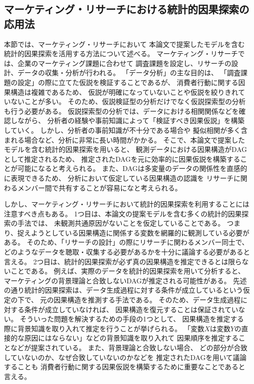 
\subsection{マーケティング・リサーチにおける統計的因果探索の応用法}

本節では、マーケティング・リサーチにおいて
本論文で提案したモデルを含む統計的因果探索を活用する方法について述べる。
マーケティング・リサーチでは、企業のマーケティング課題に合わせて
調査課題を設定し、リサーチの設計、データの収集・分析が行われる。
「データ分析」の主な目的は、
「調査課題の設定」の際に立てた仮説を検証することであるが、
消費者行動に関する因果構造は複雑であるため、
仮説が明確になっていないことや仮説を絞りきれていないことが多い。
そのため、仮説検証型の分析だけでなく仮説探索型の分析も行う必要がある。
仮説探索型の分析では、データにおける相関関係などを確認しながら、
分析者の経験や事前知識によって「検証すべき因果仮説」を構築していく。
しかし、分析者の事前知識が不十分である場合や
擬似相関が多く含まれる場合など、分析に非常に長い時間がかかる。
そこで、本論文で提案したモデルを含む統計的因果探索を用いると、
観測データにおける因果構造がDAGとして推定されるため、
推定されたDAGを元に効率的に因果仮説を構築することが可能になると考えられる。
また、DAGは多変量のデータの関係性を直感的に表現できるため、
分析において仮定している因果構造の認識を
リサーチに関わるメンバー間で共有することが容易になと考えられる。

しかし、マーケティング・リサーチにおいて統計的因果探索を利用することには注意すべき点もある。
1つ目は、本論文の提案モデルを含む多くの統計的因果探索の手法では、
未観測共通原因がないことを仮定していることである。
つまり、捉えようとしている因果構造に関係する変数を網羅的に観測している必要がある。
そのため、「リサーチの設計」の際にリサーチに関わるメンバー同士で、
どのようなデータを聴取・収集する必要があるかを十分に議論する必要があると言える。
2つ目は、統計的因果探索が必ず真の因果構造を推定できるとは限らないことである。
例えば、実際のデータを統計的因果探索を用いて分析すると、
マーケティングの背景理論と合致しないDAGが推定される可能性がある。
先述の通り統計的因果探索は、データ生成過程に対する条件が成立しているという仮定の下で、
元の因果構造を推測する手法である。
そのため、データ生成過程に対する条件が成立していなければ、
因果構造を復元することは保証されていない。
そういった問題を解決するための手段の1つとして、
因果構造を推定する際に背景知識を取り入れて推定を行うことが挙げられる。
「変数$X$は変数$Y$の直接的な原因にはならない」などの背景知識を取り入れて
因果順序を推定することなどが提案されている\cite{Shimizu2011-pd}。
また、背景理論と合致しない場合、
どの部分が合致していないのか、なぜ合致していないのかなどを
推定されたDAGを用いて議論することも
消費者行動に関する因果仮説を構築するために重要なことであると言える。
